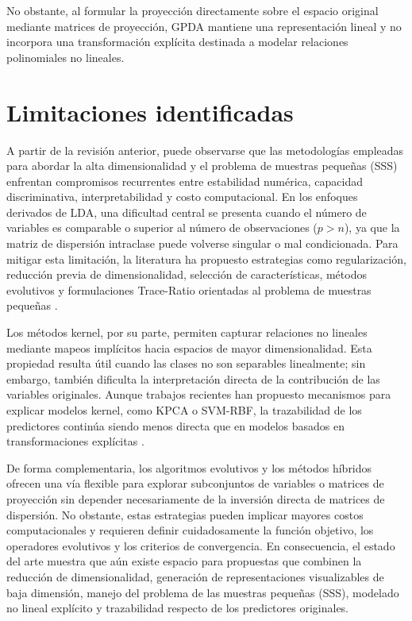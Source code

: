 No obstante, al formular la proyección directamente sobre el espacio original mediante matrices de proyección, GPDA mantiene una representación lineal y no incorpora una transformación explícita destinada a modelar relaciones polinomiales no lineales.

\section{Limitaciones identificadas}

A partir de la revisión anterior, puede observarse que las metodologías empleadas para abordar la alta dimensionalidad y el problema de muestras pequeñas (SSS) enfrentan compromisos recurrentes entre estabilidad numérica, capacidad discriminativa, interpretabilidad y costo computacional. En los enfoques derivados de LDA, una dificultad central se presenta cuando el número de variables es comparable o superior al número de observaciones ($p>n$), ya que la matriz de dispersión intraclase puede volverse singular o mal condicionada. Para mitigar esta limitación, la literatura ha propuesto estrategias como regularización, reducción previa de dimensionalidad, selección de características, métodos evolutivos y formulaciones Trace-Ratio orientadas al problema de muestras pequeñas \cite{li2024revised}. 

Los métodos kernel, por su parte, permiten capturar relaciones no lineales mediante mapeos implícitos hacia espacios de mayor dimensionalidad. Esta propiedad resulta útil cuando las clases no son separables linealmente; sin embargo, también dificulta la interpretación directa de la contribución de las variables originales. Aunque trabajos recientes han propuesto mecanismos para explicar modelos kernel, como KPCA o SVM-RBF, la trazabilidad de los predictores continúa siendo menos directa que en modelos basados en transformaciones explícitas \cite{briscik2023improvement} \cite{zhang2024fast}.


De forma complementaria, los algoritmos evolutivos y los métodos híbridos ofrecen una vía flexible para explorar subconjuntos de variables o matrices de proyección sin depender necesariamente de la inversión directa de matrices de dispersión. No obstante, estas estrategias pueden implicar mayores costos computacionales y requieren definir cuidadosamente la función objetivo, los operadores evolutivos y los criterios de convergencia. En consecuencia, el estado del arte muestra que aún existe espacio para propuestas que combinen la reducción de dimensionalidad, generación de representaciones visualizables de baja dimensión, manejo del problema de las muestras pequeñas (SSS), modelado no lineal explícito y trazabilidad respecto de los predictores originales.

